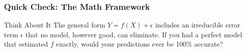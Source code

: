 
\begin{frame}[fragile]\frametitle{Quick Check: The Math Framework}
\begin{block}{Think About It}
The general form $Y = f(X) + \epsilon$ includes an irreducible error term $\epsilon$ that no model, however good, can eliminate. If you had a perfect model that estimated $f$ exactly, would your predictions ever be 100\% accurate?
\end{block}
\end{frame}

